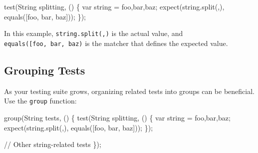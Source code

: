\documentclass[
]{article}
\newenvironment{Shaded}{\begin{snugshade}}{\end{snugshade}}
\newcommand{\CommentTok}[1]{\textcolor[rgb]{0.48,0.49,0.49}{#1}}
\newcommand{\DataTypeTok}[1]{\textcolor[rgb]{0.16,0.50,0.73}{#1}}
\newcommand{\NormalTok}[1]{\textcolor[rgb]{0.81,0.81,0.76}{#1}}
\newcommand{\OperatorTok}[1]{\textcolor[rgb]{0.81,0.81,0.76}{#1}}
\newcommand{\StringTok}[1]{\textcolor[rgb]{0.96,0.31,0.31}{#1}}
\begin{document}
\begin{Shaded}
\begin{Highlighting}[]
\NormalTok{test(}\StringTok{\textquotesingle{}String splitting\textquotesingle{}}\OperatorTok{,}\NormalTok{ () }\OperatorTok{\{}
  \DataTypeTok{var}\NormalTok{ string }\OperatorTok{=} \StringTok{\textquotesingle{}foo,bar,baz\textquotesingle{}}\NormalTok{;}
\NormalTok{  expect(string}\OperatorTok{.}\NormalTok{split(}\StringTok{\textquotesingle{},\textquotesingle{}}\NormalTok{)}\OperatorTok{,}\NormalTok{ equals([}\StringTok{\textquotesingle{}foo\textquotesingle{}}\OperatorTok{,} \StringTok{\textquotesingle{}bar\textquotesingle{}}\OperatorTok{,} \StringTok{\textquotesingle{}baz\textquotesingle{}}\NormalTok{]));}
\OperatorTok{\}}\NormalTok{);}
\end{Highlighting}
\end{Shaded}

In this example,
\texttt{string.split(\textquotesingle{},\textquotesingle{})} is the
actual value, and
\texttt{equals({[}\textquotesingle{}foo\textquotesingle{},\ \textquotesingle{}bar\textquotesingle{},\ \textquotesingle{}baz\textquotesingle{}{]})}
is the matcher that defines the expected value.

\subsection{Grouping Tests}\label{grouping-tests}

As your testing suite grows, organizing related tests into groups can be
beneficial. Use the \texttt{group} function:

\begin{Shaded}
\begin{Highlighting}[]
\NormalTok{group(}\StringTok{\textquotesingle{}String tests\textquotesingle{}}\OperatorTok{,}\NormalTok{ () }\OperatorTok{\{}
\NormalTok{  test(}\StringTok{\textquotesingle{}String splitting\textquotesingle{}}\OperatorTok{,}\NormalTok{ () }\OperatorTok{\{}
    \DataTypeTok{var}\NormalTok{ string }\OperatorTok{=} \StringTok{\textquotesingle{}foo,bar,baz\textquotesingle{}}\NormalTok{;}
\NormalTok{    expect(string}\OperatorTok{.}\NormalTok{split(}\StringTok{\textquotesingle{},\textquotesingle{}}\NormalTok{)}\OperatorTok{,}\NormalTok{ equals([}\StringTok{\textquotesingle{}foo\textquotesingle{}}\OperatorTok{,} \StringTok{\textquotesingle{}bar\textquotesingle{}}\OperatorTok{,} \StringTok{\textquotesingle{}baz\textquotesingle{}}\NormalTok{]));}
  \OperatorTok{\}}\NormalTok{);}

  \CommentTok{// Other string{-}related tests}
\OperatorTok{\}}\NormalTok{);}
\end{Highlighting}
\end{Shaded}
\end{document}

